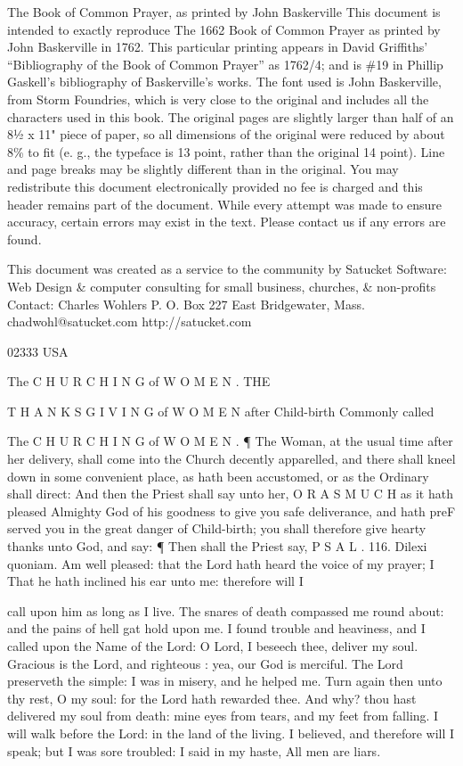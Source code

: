 
The Book of Common Prayer, as printed by John Baskerville This document is intended to exactly reproduce The 1662 Book of Common Prayer as printed by John Baskerville in 1762. This particular printing appears in David Griffiths' “Bibliography of the Book of Common Prayer” as 1762/4; and is \#19 in Phillip Gaskell's bibliography of Baskerville's works. The font used is John Baskerville, from Storm Foundries, which is very close to the original and includes all the characters used in this book. The original pages are slightly larger than half of an 8½ x 11" piece of paper, so all dimensions of the original were reduced by about 8\% to fit (e. g., the typeface is 13 point, rather than the original 14 point). Line and page breaks may be slightly different than in the original. You may redistribute this document electronically provided no fee is charged and this header remains part of the document. While every attempt was made to ensure accuracy, certain errors may exist in the text. Please contact us if any errors are found.

This document was created as a service to the community by Satucket Software: Web Design \& computer consulting for small business, churches, \& non-profits Contact: Charles Wohlers P. O. Box 227 East Bridgewater, Mass. chadwohl@satucket.com http://satucket.com

02333 USA

The C H U R C H I N G of W O M E N . THE

T H A N K S G I V I N G of W O M E N after Child-birth Commonly called

The C H U R C H I N G of W O M E N . ¶ The Woman, at the usual time after her delivery, shall come into the Church decently apparelled, and there shall kneel down in some convenient place, as hath been accustomed, or as the Ordinary shall direct: And then the Priest shall say unto her, O R A S M U C H as it hath pleased Almighty God of his goodness to give you safe deliverance, and hath preF served you in the great danger of Child-birth; you shall therefore give hearty thanks unto God, and say: ¶ Then shall the Priest say, P S A L . 116. Dilexi quoniam. Am well pleased: that the Lord hath heard the voice of my prayer; I That he hath inclined his ear unto me: therefore will I

call upon him as long as I live. The snares of death compassed me round about: and the pains of hell gat hold upon me. I found trouble and heaviness, and I called upon the Name of the Lord: O Lord, I beseech thee, deliver my soul. Gracious is the Lord, and righteous : yea, our God is merciful. The Lord preserveth the simple: I was in misery, and he helped me. Turn again then unto thy rest, O my soul: for the Lord hath rewarded thee. And why? thou hast delivered my soul from death: mine eyes from tears, and my feet from falling. I will walk before the Lord: in the land of the living. I believed, and therefore will I speak; but I was sore troubled: I said in my haste, All men are liars.


